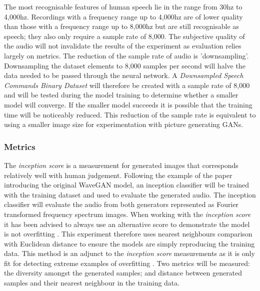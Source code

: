 \documentclass[a4paper, dvipsnames, titlepage]{article}
\begin{document}
The most recognisable features of human speech lie in the range from 30hz to 4,000hz.
Recordings with a frequency range up to 4,000hz are of lower quality than those with a frequency range up to 8,000hz but are still recognisable as speech; they also only require a sample rate of 8,000.
The subjective quality of the audio will not invalidate the results of the experiment as evaluation relies largely on metrics.
\newline
\newline
The reduction of the sample rate of audio is 'downsampling'.
Downsampling the dataset elements to 8,000 samples per second will halve the data needed to be passed through the neural network.
A \textit{Downsampled Speech Commands Binary Dataset} will therefore be created with a sample rate of 8,000 and will be tested during the model training to determine whether a smaller model will converge.
If the smaller model succeeds it is possible that the training time will be noticeably reduced.
This reduction of the sample rate is equivalent to using a smaller image size for experimentation with picture generating GANs.

\subsubsection{Metrics}

The \textit{inception score} is a measurement for generated images that corresponds relatively well with human judgement.
Following the example of the paper introducing the original WaveGAN model, an inception classifier will be trained with the training dataset and used to evaluate the generated audio.
The inception classifier will evaluate the audio from both generators represented as Fourier transformed frequency spectrum images.
\newline
\newline
When working with the \textit{inception score} it has been advised to always use an alternative score to demonstrate the model is not overfitting \citep{2018arXiv180101973B}.
This experiment therefore uses nearest neighbours comparison with Euclidean distance to ensure the models are simply reproducing the training data.
This method is an adjunct to the \textit{inception score} measurements as it is only fit for detecting extreme examples of overfitting \citep{2015arXiv151101844T}.
Two metrics will be measured: the diversity amongst the generated samples; and distance between generated samples and their nearest neighbour in the training data.
\end{document}
